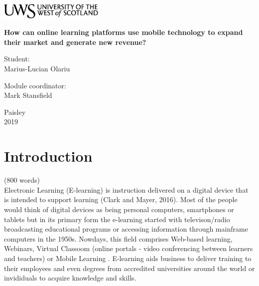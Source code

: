 \documentclass[11]{article}
\begin{document}
\begin{titlepage}
	\begin{center}	
		\includegraphics[width = 5cm,height = 1.5cm]{uws_logo.png}\\[5cm]
	
{ \huge \bfseries %
		How can online learning platforms use mobile technology to expand their market and generate new revenue?\\ \Large 
}
	\vspace{2cm}
	
	{\huge
	}

	\vspace{2cm}			
			
		\begin{flushright}
				\large Student:\\
				Marius-Lucian Olariu\\[1cm]
		\end{flushright}
		
	
		\begin{flushleft}
			 \large
				Module coordinator: \\
				Mark Stansfield \\[1cm]
		\end{flushleft}
		
	\vspace{2cm}	
	
		
		\vfill
		
		{\large {Paisley \\ 2019}}
		\end{center}
\end{titlepage}

\newpage

\tableofcontents

\listoffigures

\listoftables

\newpage
\section{Introduction}(800 words)\\

		Electronic Learning (E-learning) is instruction delivered on a digital device that is intended to support learning (Clark and Mayer, 2016). Most of the people would think of digital devices as being personal computers, smartphones or tablets but  in its primary form the e-learning started with televison/radio broadcasting  educational programs or accessing information through mainframe computers in the 1950s. Nowdays, this field comprises Web-based learning, Webinars, Virtual Classoom (online portals - video conferencing between learners and teachers) or Mobile Learning . E-learning  aids business to deliver training to their employees and even degrees from accredited universities around the world or invididuals to acquire knowledge and skills.\\
\end{document}
